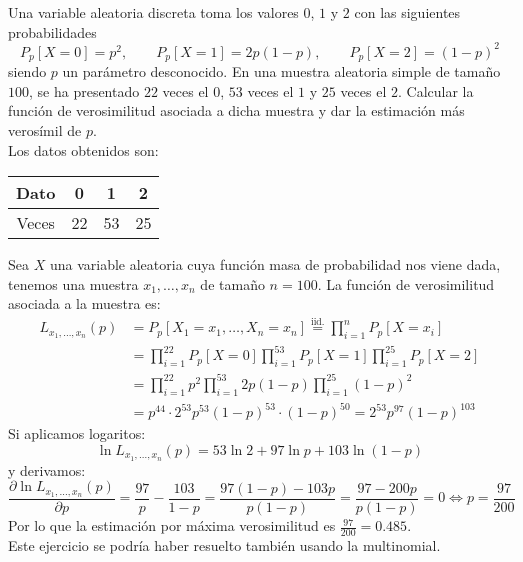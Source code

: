 \begin{ejercicio} %
    Una variable aleatoria discreta toma los valores $0$, $1$ y $2$ con las siguientes probabilidades
    \begin{equation*}
        P_p[X=0] = p^2, \qquad P_p[X=1] = 2p(1-p), \qquad P_p[X=2] = {(1-p)}^{2}
    \end{equation*}
    siendo $p$ un parámetro desconocido. En una muestra aleatoria simple de tamaño $100$, se ha presentado $22$ veces el $0$, $53$ veces el $1$ y $25$ veces el $2$. Calcular la función de verosimilitud asociada a dicha muestra y dar la estimación más verosímil de $p$.\\

    \noindent
    Los datos obtenidos son:
    \begin{table}[H]
    \centering
    \begin{tabular}{c|ccc}
        Dato & 0 & 1 & 2 \\
        \hline
        Veces & 22 & 53 & 25
    \end{tabular}
    \end{table}
    Sea $X$ una variable aleatoria cuya función masa de probabilidad nos viene dada, tenemos una muestra $x_1, \ldots, x_n$ de tamaño $n=100$. La función de verosimilitud asociada a la muestra es:
    \begin{align*}
        L_{x_1,\ldots,x_n}(p) &= P_p[X_1=x_1, \ldots, X_n = x_n] \stackrel{\text{iid.}}{=}\prod_{i=1}^{n}P_p[X=x_i]\\ 
                              &= \prod_{i=1}^{22}P_p[X=0] \prod_{i=1}^{53}P_p[X=1]\prod_{i=1}^{25}P_p[X=2] \\
                              &= \prod_{i=1}^{22}p^2 \prod_{i=1}^{53}2p(1-p)\prod_{i=1}^{25}{(1-p)}^{2} \\
                              &= p^{44} \cdot 2^{53}p^{53}{(1-p)}^{53} \cdot {(1-p)}^{50} = 2^{53}p^{97}{(1-p)}^{103}
    \end{align*}
    Si aplicamos logaritos:
    \begin{equation*}
        \ln L_{x_1,\ldots,x_n}(p) = 53\ln 2 + 97 \ln p + 103 \ln(1-p)
    \end{equation*}
    y derivamos:
    \begin{equation*}
        \dfrac{\partial \ln L_{x_1,\ldots,x_n}(p)}{\partial p} = \frac{97}{p} - \frac{103}{1-p} = \frac{97(1-p)-103p}{p(1-p)} = \frac{97 - 200p}{p(1-p)} = 0 \Longleftrightarrow p = \frac{97}{200}
    \end{equation*}
    Por lo que la estimación por máxima verosimilitud es $\frac{97}{200} = 0.485$.\\

    \noindent
    Este ejercicio se podría haber resuelto también usando la multinomial.
\end{ejercicio}


